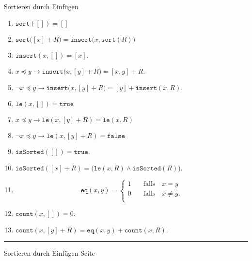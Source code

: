\documentclass{slides}
\newcounter{mypage}
\begin{document}
\begin{center}
Sortieren durch Einf\"ugen
\end{center}

\footnotesize
\begin{enumerate}
\item $\mathtt{sort}([]) = []$
\item $\mathtt{sort}\bigl([x] + R\bigr) = \mathtt{insert}\bigl(x, \mathtt{sort}(R)\bigr)$
\item $\mathtt{insert}(x,[]) = [x]$.
\item $x \preceq y \rightarrow \mathtt{insert}\bigl(x, [y] + R\bigr) = [x,y] + R$. 
\item $\neg x \preceq y \rightarrow \mathtt{insert}\bigl(x, [y] + R\bigr) = [y] + \mathtt{insert}(x,R)$. 
\item $\mathtt{le}(x, []) = \mathtt{true}$
\item $x \preceq y \rightarrow \mathtt{le}(x, [y] + R) = \mathtt{le}(x, R)$
\item $\neg x \preceq y \rightarrow \mathtt{le}(x, [y] + R) = \mathtt{false}$
\item $\mathtt{isSorted}([]) = \mathtt{true}$.

\item $\mathtt{isSorted}([x]+R) = \bigl(\mathtt{le}(x,R) \wedge \mathtt{isSorted}(R)\bigr)$.

\item 
  $$
  \mathtt{eq}(x,y) = \left\{
  \begin{array}{ll}
    1 & \quad \mbox{falls}\quad x = y \\
    0 & \quad \mbox{falls}\quad x \not= y. \\
  \end{array}
  \right.
  $$

\item $\mathtt{count}(x,[]) = 0$.

\item $\mathtt{count}(x,[y] + R) = \mathtt{eq}(x,y) + \mathtt{count}(x, R)$.
\end{enumerate}


\footnotesize

\vspace*{\fill}
\tiny \addtocounter{mypage}{1}
\rule{17cm}{1mm}
Sortieren durch Einf\"ugen  \hspace*{\fill} Seite 

\end{document}
